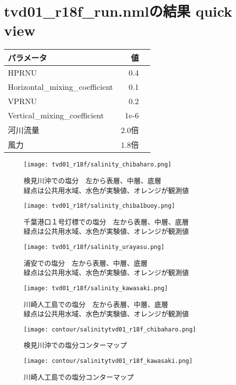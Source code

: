 \documentclass[fontsize=12pt,paper=a4]{jlreq}
\begin{document}
\section{tvd01\_r18f\_run.nmlの結果 quick view}
\begin{table}
  \begin{minipage}[hbtp]{0.5\hsize}
    \begin{tabular}{lrr} \toprule
      パラメータ & 値 \\ \midrule
      HPRNU & 0.4\\
      Horizontal\_mixing\_coefficient & 0.1\\
      VPRNU & 0.2\\
      Vertical\_mixing\_coefficient & 1e-6\\
      河川流量 & 2.0倍 \\
      風力 & 1.8倍\\ \bottomrule
    \end{tabular}
  \end{minipage}
\end{table}

\begin{figure}[hbtp]
        \centering
        \texttt{[image: tvd01\_r18f/salinity\_chibaharo.png]}
        \caption{検見川沖での塩分　左から表層、中層、底層\\緑点は公共用水域、水色が実験値、オレンジが観測値}
\end{figure}
\begin{figure}[hbtp]
    \centering
    \texttt{[image: tvd01\_r18f/salinity\_chiba1buoy.png]}
    \caption{千葉港口１号灯標での塩分　左から表層、中層、底層\\緑点は公共用水域、水色が実験値、オレンジが観測値}
\end{figure}%
\begin{figure}[hbtp]
        \centering
        \texttt{[image: tvd01\_r18f/salinity\_urayasu.png]}
        \caption{浦安での塩分　左から表層、中層、底層\\緑点は公共用水域、水色が実験値、オレンジが観測値}
\end{figure}%
\begin{figure}[hbtp]
        \centering
        \texttt{[image: tvd01\_r18f/salinity\_kawasaki.png]}
        \caption{川崎人工島での塩分　左から表層、中層、底層\\緑点は公共用水域、水色が実験値、オレンジが観測値}
\end{figure}
\begin{figure}[hbtp]
        \centering
        \texttt{[image: contour/salinitytvd01\_r18f\_chibaharo.png]}
        \caption{検見川沖での塩分コンターマップ}
\end{figure}
\begin{figure}[hbtp]
    \centering
    \texttt{[image: contour/salinitytvd01\_r18f\_kawasaki.png]}
    \caption{川崎人工島での塩分コンターマップ}
\end{figure}
\end{document}

